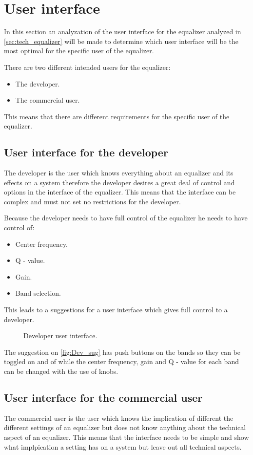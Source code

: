 \section{User interface} \label{sec:user_interface}
In this section an analyzation of the user interface for the equalizer analyzed in \autoref{sec:tech_equalizer} will be made to determine which user interface will be the most optimal for the specific user of the equalizer. 

There are two different intended users for the equalizer: 
\begin{itemize}
\item The developer.
\item The commercial user.
\end{itemize}
This means that there are different requirements for the specific user of the equalizer.

\subsection*{User interface for the developer}
The developer is the user which knows everything about an equalizer and its effects on a system therefore the developer desires a great deal of control and options in the interface of the equalizer. This means that the interface can be complex and must not set no restrictions for the developer.  

Because the developer needs to have full control of the equalizer he needs to have control of: 
\begin{itemize}
\item Center frequency.
\item Q - value.
\item Gain.
\item Band selection.
\end{itemize} 
This leads to a suggestions for a user interface which gives full control to a developer.

\begin{figure}[H]
\centering
{}

\caption{Developer user interface.}
\label{fig:Dev_sug}
\end{figure}

The suggestion on \autoref{fig:Dev_sug} has push buttons on the bands so they can be toggled on and of while the center frequency, gain and Q - value for each band can be changed with the use of knobs. 

\subsection*{User interface for the commercial user}
The commercial user is the user which knows the implication of different the different settings of an equalizer but does not know anything about the technical aspect of an equalizer. This means that the interface needs to be simple and show what implpication a setting has on a system but leave out all technical aspects. 

